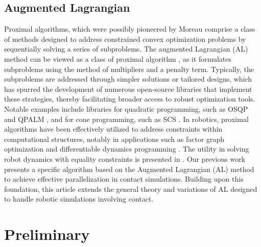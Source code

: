 \documentclass[lettersize,journal]{IEEEtran}
\begin{document}
\subsection{Augmented Lagrangian}
 
Proximal algorithms, which were possibly pioneered by Moreau \cite{moreau1962fonctions} comprise a class of methods designed to address constrained convex optimization problems by sequentially solving a series of subproblems. 
The augmented Lagrangian (AL) method can be viewed as a class of proximal algorithm \cite{parikh2014proximal}, as it formulates subproblems using the method of multipliers and a penalty term. 
Typically, the subproblems are addressed through simpler solutions or tailored designs, which has spurred the development of numerous open-source libraries that implement these strategies, thereby facilitating broader access to robust optimization tools. Notable examples include libraries for quadratic programming, such as OSQP \cite{stellato2020osqp} and QPALM \cite{hermans2019qpalm}, and for cone programming, such as SCS \cite{sopasakis2019superscs}.
In robotics, proximal algorithms have been effectively utilized to address constraints within computational structures, notably in applications such as factor graph optimization \cite{bazzana2024augmented} and differentiable dynamics programming \cite{howell2019altro}.
The utility in solving robot dynamics with equality constraints is presented in \cite{carpentier2021proximal}. 
Our previous work \cite{lee2023modular} presents a specific algorithm based on the Augmented Lagrangian (AL) method to achieve effective parallelization in contact simulations. Building upon this foundation, this article extends the general theory and variations of AL designed to handle robotic simulations involving contact.



\section{Preliminary} \label{sec:background}
\end{document}
